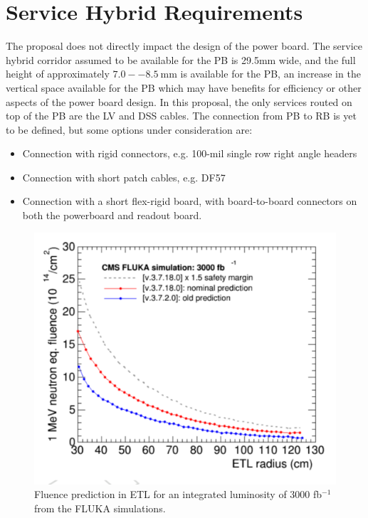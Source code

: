 \documentclass[11pt]{article}
\begin{document}
\section{Service Hybrid Requirements}

The proposal does not directly impact the design of the power board.
The service hybrid corridor assumed to be available for the PB is 29.5mm wide, and the full height of approximately $7.0--8.5~\mathrm{mm}$ is available for the PB, an increase in the vertical space available for the PB which may have benefits for efficiency or other aspects of the power board design.
In this proposal, the only services routed on top of the PB are the LV and DSS cables.
The connection from PB to RB is yet to be defined, but some options under consideration are:
\begin{itemize}
  \item Connection with rigid connectors, e.g. 100-mil single row right angle headers
  \item Connection with short patch cables, e.g. DF57
  \item Connection with a short flex-rigid board, with board-to-board connectors on both the powerboard and readout board.
\end{itemize}

\begin{figure}[!ht]
\centering
\includegraphics[width=\linewidth]{figures/image6.pdf}
\caption{
Fluence prediction in ETL for an integrated luminosity of 3000 fb$^{-1}$ from the FLUKA simulations.}
\label{fig:fluka}
\end{figure}
\end{document}
